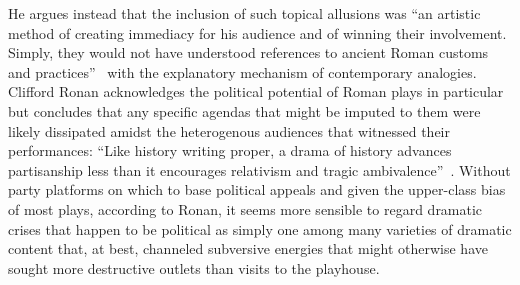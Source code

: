 He argues instead that the inclusion of such topical allusions was ``an artistic method of creating immediacy for his audience and of winning their involvement.
Simply, they would not have understood references to ancient Roman customs and practices''~\cite[72]{george_plutarch_2000} with the explanatory mechanism of contemporary analogies.
Clifford Ronan acknowledges the political potential of Roman plays in particular but concludes that any specific agendas that might be imputed to them were likely dissipated amidst the heterogenous audiences that witnessed their performances: ``Like history writing proper, a drama of history advances partisanship less than it encourages relativism and tragic ambivalence''~\cite[51]{ronan_antike_1995}.
Without party platforms on which to base political appeals and given the upper-class bias of most plays, according to Ronan, it seems more sensible to regard dramatic crises that happen to be political as simply one among many varieties of dramatic content that, at best, channeled subversive energies that might otherwise have sought more destructive outlets than visits to the playhouse.


